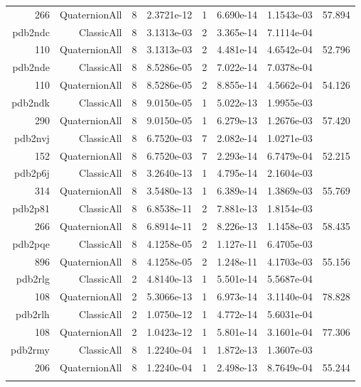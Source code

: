 \begin{xltabular}{\textwidth}{r|rcS[table-format=1.4e+2]cS[table-format=1.3e+2]S[table-format=1.4e+2]S[table-format=-1.3]}
266 & QuaternionAll & 8 & 2.3721e-12 & 1 & 6.690e-14 & 1.1543e-03 & 57.894\\  \addlinespace
pdb2ndc & ClassicAll & 8 & 3.1313e-03 & 2 & 3.365e-14 & 7.1114e-04 & \\
110 & QuaternionAll & 8 & 3.1313e-03 & 2 & 4.481e-14 & 4.6542e-04 & 52.796\\  \addlinespace
pdb2nde & ClassicAll & 8 & 8.5286e-05 & 2 & 7.022e-14 & 7.0378e-04 & \\
110 & QuaternionAll & 8 & 8.5286e-05 & 2 & 8.855e-14 & 4.5662e-04 & 54.126\\  \addlinespace
pdb2ndk & ClassicAll & 8 & 9.0150e-05 & 1 & 5.022e-13 & 1.9955e-03 & \\
290 & QuaternionAll & 8 & 9.0150e-05 & 1 & 6.279e-13 & 1.2676e-03 & 57.420\\  \addlinespace
pdb2nvj & ClassicAll & 8 & 6.7520e-03 & 7 & 2.082e-14 & 1.0271e-03 & \\
152 & QuaternionAll & 8 & 6.7520e-03 & 7 & 2.293e-14 & 6.7479e-04 & 52.215\\  \addlinespace
pdb2p6j & ClassicAll & 8 & 3.2640e-13 & 1 & 4.795e-14 & 2.1604e-03 & \\
314 & QuaternionAll & 8 & 3.5480e-13 & 1 & 6.389e-14 & 1.3869e-03 & 55.769\\  \addlinespace
pdb2p81 & ClassicAll & 8 & 6.8538e-11 & 2 & 7.881e-13 & 1.8154e-03 & \\
266 & QuaternionAll & 8 & 6.8914e-11 & 2 & 8.226e-13 & 1.1458e-03 & 58.435\\  \addlinespace
pdb2pqe & ClassicAll & 8 & 4.1258e-05 & 2 & 1.127e-11 & 6.4705e-03 & \\
896 & QuaternionAll & 8 & 4.1258e-05 & 2 & 1.248e-11 & 4.1703e-03 & 55.156\\  \addlinespace
pdb2rlg & ClassicAll & 2 & 4.8140e-13 & 1 & 5.501e-14 & 5.5687e-04 & \\
108 & QuaternionAll & 2 & 5.3066e-13 & 1 & 6.973e-14 & 3.1140e-04 & 78.828\\  \addlinespace
pdb2rlh & ClassicAll & 2 & 1.0750e-12 & 1 & 4.772e-14 & 5.6031e-04 & \\
108 & QuaternionAll & 2 & 1.0423e-12 & 1 & 5.801e-14 & 3.1601e-04 & 77.306\\  \addlinespace
pdb2rmy & ClassicAll & 8 & 1.2240e-04 & 1 & 1.872e-13 & 1.3607e-03 & \\
206 & QuaternionAll & 8 & 1.2240e-04 & 1 & 2.498e-13 & 8.7649e-04 & 55.244\\  \addlinespace

\end{xltabular}

